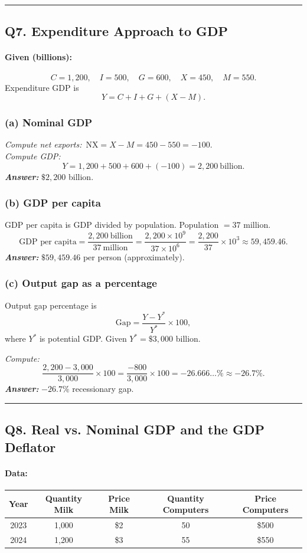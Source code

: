 \documentclass[11pt]{article}
\begin{document}
\bigskip
\hrule
\bigskip
\newpage
\subsection*{Q7. Expenditure Approach to GDP}

\paragraph{Given (billions):}
\[
C=1{,}200,\quad I=500,\quad G=600,\quad X=450,\quad M=550.
\]
Expenditure GDP is
\[
Y=C+I+G+(X-M).
\]

\subsubsection*{(a) Nominal GDP}
\emph{Compute net exports:}\ \(\text{NX}=X-M=450-550=-100.\)\\
\emph{Compute GDP:}
\[
Y=1{,}200+500+600+(-100)=2{,}200\ \text{billion}.
\]
\emph{\textbf{Answer:}} \(\$2{,}200\) billion.

\subsubsection*{(b) GDP per capita}
 GDP per capita is GDP divided by population. Population \(=37\) million.
\[
\text{GDP per capita}=
\frac{2{,}200\ \text{billion}}{37\ \text{million}}
=
\frac{2{,}200\times 10^9}{37\times 10^6}
=
\frac{2{,}200}{37}\times 10^3
\approx 59{,}459.46.
\]
\emph{\textbf{Answer:}} \(\$59{,}459.46\) per person (approximately).

\subsubsection*{(c) Output gap as a percentage}
Output gap percentage is
\[
\text{Gap}=\frac{Y-Y^\ast}{Y^\ast}\times 100,
\]
where \(Y^\ast\) is potential GDP. Given \(Y^\ast=\$3{,}000\) billion.

\emph{Compute:}
\[
\frac{2{,}200-3{,}000}{3{,}000}\times 100
=
\frac{-800}{3{,}000}\times 100
=
-26.666\ldots\%
\approx -26.7\%.
\]
\emph{\textbf{Answer:}} \(-26.7\%\) recessionary gap.

\bigskip
\hrule
\bigskip

\subsection*{Q8. Real vs. Nominal GDP and the GDP Deflator}

\paragraph{Data:}
\begin{center}
\begin{tabular}{c c c c c}
\toprule
Year & Quantity Milk & Price Milk & Quantity Computers & Price Computers \\
\midrule
2023 & 1{,}000 & \$2 & 50 & \$500 \\
2024 & 1{,}200 & \$3 & 55 & \$550 \\
\bottomrule
\end{tabular}
\end{center}
\end{document}
